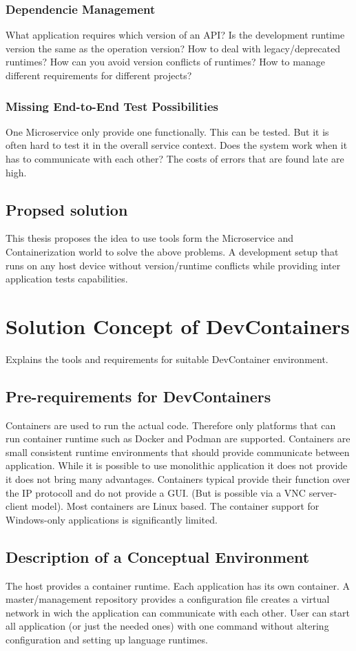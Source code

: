 \documentclass[12pt, a4paper]{article}
\begin{document}
        \subsubsection{Dependencie Management}
        What application requires which version of an API? Is the development runtime version the same as the operation version? How to deal with legacy/deprecated runtimes? How can you avoid version conflicts of runtimes? How to manage different requirements for different projects?
        \subsubsection{Missing End-to-End Test Possibilities}
        One Microservice only provide one functionally. This can be tested. But it is often hard to test it in the overall service context. Does the system work when it has to communicate with each other? The costs of errors that are found late are high.
    \subsection{Propsed solution}
    This thesis proposes the idea to use tools form the Microservice and Containerization world to solve the above problems. A development setup that runs on any host device without version/runtime conflicts while providing inter application tests capabilities.

\section{Solution Concept of DevContainers}\label{sec::solution_concept}
Explains the tools and requirements for suitable DevContainer environment.
    \subsection{Pre-requirements for DevContainers}
    Containers are used to run the actual code. Therefore only platforms that can run container runtime such as Docker and Podman are supported. Containers are small consistent runtime environments that should provide communicate between application. While it is possible to use monolithic application it does not provide it does not bring many advantages.
    Containers typical provide their function over the IP protocoll and do not provide a GUI. (But is possible via a VNC server-client model). Most containers are Linux based. The container support for Windows-only applications is significantly limited.
    \subsection{Description of a Conceptual Environment}
    The host provides a container runtime. Each application has its own container. A master/management repository provides a configuration file creates a virtual network in wich the application can communicate with each other. User can start all application (or just the needed ones) with one command without altering configuration and setting up language runtimes.
\end{document}
